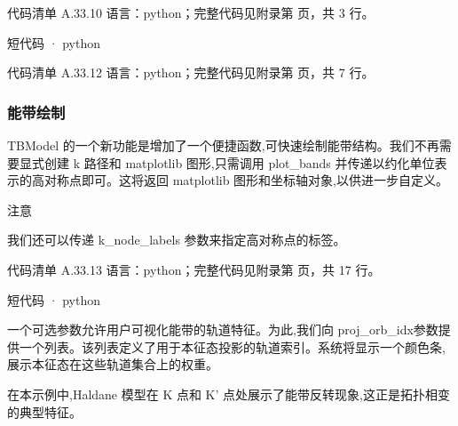 \documentclass[lang=cn,scheme=chinese,color=blue,device=normal,toc=onecol,math=cm]{elegantbook}
\begin{document}
\begin{codeindexbox}{代码清单 A.33.10}
语言：python；完整代码见附录第 \pageref{code:33:10} 页，共 3 行。
\end{codeindexbox}


\begin{inlinecodebox}{短代码 · python}
\end{inlinecodebox}


\begin{codeindexbox}{代码清单 A.33.12}
语言：python；完整代码见附录第 \pageref{code:33:12} 页，共 7 行。
\end{codeindexbox}


\subsubsection{能带绘制}


TBModel 的一个新功能是增加了一个便捷函数,可快速绘制能带结构。我们不再需要显式创建 k 路径和 matplotlib 图形,只需调用 plot\_\allowbreak{}bands 并传递以约化单位表示的高对称点即可。这将返回 matplotlib 图形和坐标轴对象,以供进一步自定义。\par


注意\par


我们还可以传递 k\_\allowbreak{}node\_\allowbreak{}labels 参数来指定高对称点的标签。\par


\begin{codeindexbox}{代码清单 A.33.13}
语言：python；完整代码见附录第 \pageref{code:33:13} 页，共 17 行。
\end{codeindexbox}


\begin{inlinecodebox}{短代码 · python}
\end{inlinecodebox}


一个可选参数允许用户可视化能带的轨道特征。为此,我们向 proj\_\allowbreak{}orb\_\allowbreak{}idx参数提供一个列表。该列表定义了用于本征态投影的轨道索引。系统将显示一个颜色条,展示本征态在这些轨道集合上的权重。\par


在本示例中,Haldane 模型在 K 点和 K’ 点处展示了能带反转现象,这正是拓扑相变的典型特征。\par
\end{document}
